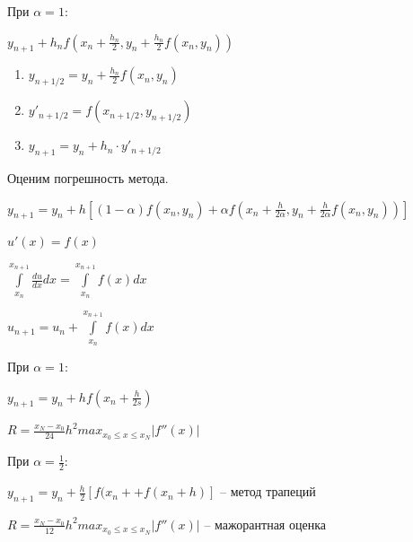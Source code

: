 \documentclass[a4paper,14pt]{article}
\begin{document}
При $\alpha = 1$:

$y_{n+1} + h_n f(x_n + \frac{h_n}{2}, y_n + \frac{h_n}{2} f(x_n, y_n))$

\newpage
\begin{figure}[!h]
	\label{fig:rk22}
\end{figure}

\begin{enumerate}
	\item $y_{n+1/2} = y_n + \frac{h_n}{2} f(x_n, y_n)$
	\item $y'_{n+1/2} = f(x_{n+1/2}, y_{n+1/2})$
	\item $y_{n+1} = y_n + h_n \cdot y'_{n+1/2}$
\end{enumerate}

Оценим погрешность метода.

$y_{n+1} = y_n + h \left[ (1 - \alpha) f(x_n, y_n) + \alpha f(x_n + \frac{h}{2 \alpha}, y_n + \frac{h}{2 \alpha} f(x_n, y_n) ) \right]$

$u'(x) = f(x)$

$\int\limits_{x_n}^{x_{n+1}} \frac{du}{dx} dx = \int\limits_{x_n}^{x_{n+1}} f(x) dx $

$u_{n+1} = u_n + \int\limits_{x_n}^{x_{n+1}} f(x) dx $

При $\alpha = 1$:

$y_{n+1} = y_n + h f(x_n + \frac{h}{2s})$

$R = \frac{x_N - x_0}{24} h^2 max_{x_0 \leq x \leq x_N} |f''(x)|$

При $\alpha = \frac{1}{2}$:

$y_{n+1} = y_n + \frac{h}{2} \left[ f(x_n+ + f(x_n + h) \right]$ -- метод трапеций

$R = \frac{x_N - x_0}{12} h^2 max_{x_0 \leq x \leq x_N} |f''(x)|$ -- мажорантная оценка
\end{document}
